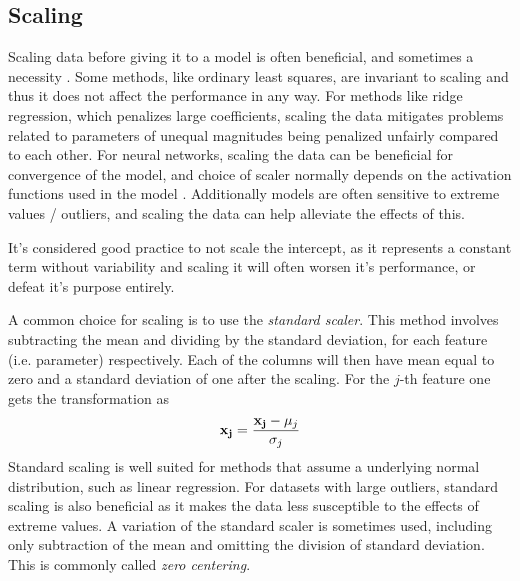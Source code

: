 
\subsection{Scaling}\label{sec:scale}
Scaling data before giving it to a model is often beneficial, and sometimes a necessity \citep[Linear Regression]{morten}. Some methods, like ordinary least squares, are invariant to scaling and thus it does not affect the performance in any way. For methods like ridge regression, which penalizes large coefficients, scaling the data mitigates problems related to parameters of unequal magnitudes being penalized unfairly compared to each other. For neural networks, scaling the data can be beneficial for convergence of the model, and choice of scaler normally depends on the activation functions used in the model \citep[Ch.7]{Goodfellow-et-al-2016}. Additionally models are often sensitive to extreme values / outliers, and scaling the data can help alleviate the effects of this. 

It's considered good practice to not scale the intercept, as it represents a constant term without variability and scaling it will often worsen it's performance, or defeat it's purpose entirely.

A common choice for scaling is to use the \textit{standard scaler}. This method involves subtracting the mean and dividing by the standard deviation, for each feature (i.e. parameter) respectively. Each of the columns will then have mean equal to zero and a standard deviation of one after the scaling. For the $j$-th feature one gets the transformation as 
\begin{equation}\label{standardize}
    \bold{x_j} = \frac{\bold{x_j}-\mu_j}{\sigma_{j}}
\end{equation}
Standard scaling is well suited for methods that assume a underlying normal distribution, such as linear regression. For datasets with large outliers, standard scaling is also beneficial as it makes the data less susceptible to the effects of extreme values.
A variation of the standard scaler is sometimes used, including only subtraction of the mean and omitting the division of standard deviation. This is commonly called \textit{zero centering}. 

